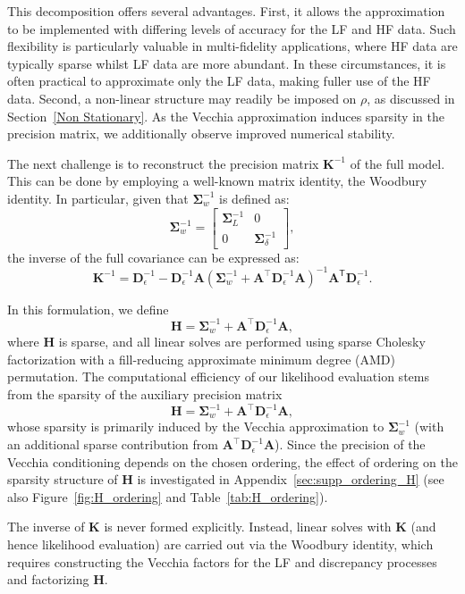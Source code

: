 \documentclass[12pt]{article}
\begin{document}
\noindent
\hangindent=-5mm
This decomposition offers several advantages. First, it allows the approximation to be implemented with differing levels of accuracy for the LF and HF data. Such flexibility is particularly valuable in multi-fidelity applications, where HF data are typically sparse whilst LF data are more abundant. In these circumstances, it is often practical to approximate only the LF data, making fuller use of the HF data. Second, a non-linear structure may readily be imposed on $\rho$, as discussed in Section~\ref{Non Stationary}. As the Vecchia approximation induces sparsity in the precision matrix, we additionally observe improved numerical stability.

The next challenge is to reconstruct the precision matrix $\bm{K}^{-1}$ of the full model. This can be done by employing a well-known matrix identity, the Woodbury identity. In particular, given that $\bm{\Sigma}^{-1}_w$ is defined as:
\[
\bm{\Sigma}^{-1}_w = 
\begin{bmatrix} 
\bm{\Sigma}^{-1}_{L} & 0 \\ 
0 & \bm{\Sigma}^{-1}_{\delta} 
\end{bmatrix},
\]
the inverse of the full covariance can be expressed as:
\[
\bm{K}^{-1} = \bm{D}_{\epsilon}^{-1} - \bm{D}_{\epsilon}^{-1} \bm{A} \left( \boldsymbol{\Sigma}_{w}^{-1} + \bm{A}^\top \bm{D}_{\epsilon}^{-1} \bm{A} \right)^{-1} \bm{A}^\mathsf{T} \bm{D}_{\epsilon}^{-1}.
\]

\noindent
\hangindent=-5mm
In this formulation, we define
\[
\bm{H} = \boldsymbol{\Sigma}_{w}^{-1} + \bm{A}^\top \bm{D}_{\epsilon}^{-1} \bm{A},
\]
where $\bm{H}$ is sparse, and all linear solves
are performed using sparse Cholesky factorization with a fill-reducing
approximate minimum degree (AMD) permutation.
The computational efficiency of our likelihood evaluation stems from the sparsity of the auxiliary precision matrix
\[
\bm{H}=\bm{\Sigma}_w^{-1}+\bm{A}^\top \bm{D}_\epsilon^{-1}\bm{A},
\]
whose sparsity is primarily induced by the Vecchia approximation to $\bm{\Sigma}_w^{-1}$ (with an additional sparse contribution from $\bm{A}^\top \bm{D}_\epsilon^{-1}\bm{A}$). Since the precision of the Vecchia conditioning depends on the chosen ordering, the effect of ordering on the sparsity structure of $\bm{H}$ is investigated in Appendix~\ref{sec:supp_ordering_H} (see also Figure~\ref{fig:H_ordering} and Table~\ref{tab:H_ordering}).

The inverse of $\bm{K}$ is never formed explicitly. Instead, linear solves with $\bm{K}$ (and hence likelihood evaluation) are carried out via the Woodbury identity, which requires constructing the Vecchia factors for the LF and discrepancy processes and factorizing $\bm{H}$.  
\end{document}
